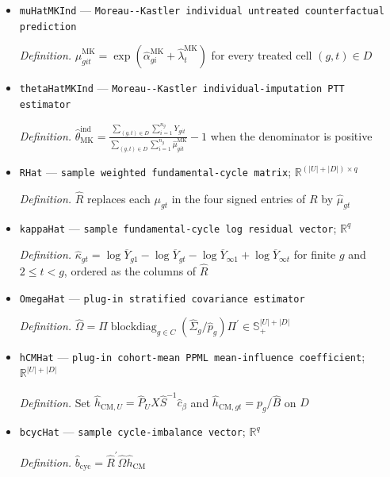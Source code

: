 \documentclass{article}
\begin{document}
\begin{itemize}
  \item \texttt{muHatMKInd} --- \texttt{Moreau-\allowbreak{}-\allowbreak{}Kastler individual untreated counterfactual prediction}
  \par\smallskip\noindent\emph{Definition.} \(\widehat\mu^{\mathrm{MK}}_{git}=\exp(\widehat\alpha^{\mathrm{MK}}_{gi}+\widehat\lambda^{\mathrm{MK}}_t)\) for every treated cell \((g,t)\in D\)
  \item \texttt{thetaHatMKInd} --- \texttt{Moreau-\allowbreak{}-\allowbreak{}Kastler individual-\allowbreak{}imputation PTT estimator}
  \par\smallskip\noindent\emph{Definition.} \(\widehat\theta_{\mathrm{MK}}^{\mathrm{ind}}=\frac{\sum_{(g,t)\in D}\sum_{i=1}^{n_g}Y_{git}}{\sum_{(g,t)\in D}\sum_{i=1}^{n_g}\widehat\mu^{\mathrm{MK}}_{git}}-1\) when the denominator is positive
  \item \texttt{RHat} --- \texttt{sample weighted fundamental-\allowbreak{}cycle matrix}; \(\mathbb R^{(|U|+|D|)\times q}\)
  \par\smallskip\noindent\emph{Definition.} \(\widehat R\) replaces each \(\mu_{gt}\) in the four signed entries of \(R\) by \(\widehat\mu_{gt}\)
  \item \texttt{kappaHat} --- \texttt{sample fundamental-\allowbreak{}cycle log residual vector}; \(\mathbb R^q\)
  \par\smallskip\noindent\emph{Definition.} \(\widehat\kappa_{gt}=\log\overline Y_{g1}-\log\overline Y_{gt}-\log\overline Y_{\infty 1}+\log\overline Y_{\infty t}\) for finite \(g\) and \(2\le t<g\), ordered as the columns of \(\widehat R\)
  \item \texttt{OmegaHat} --- \texttt{plug-\allowbreak{}in stratified covariance estimator}
  \par\smallskip\noindent\emph{Definition.} \(\widehat\Omega=\Pi\operatorname{blockdiag}_{g\in C}(\widehat\Sigma_g/\widehat p_g)\Pi^{\prime}\in\mathbb S_+^{|U|+|D|}\)
  \item \texttt{hCMHat} --- \texttt{plug-\allowbreak{}in cohort-\allowbreak{}mean PPML mean-\allowbreak{}influence coefficient}; \(\mathbb R^{|U|+|D|}\)
  \par\smallskip\noindent\emph{Definition.} Set \(\widehat h_{\mathrm{CM},U}=\widehat P_UX\widehat S^{-1}\widehat c_{\beta}\) and \(\widehat h_{\mathrm{CM},gt}=p_g/\widehat B\) on \(D\)
  \item \texttt{bcycHat} --- \texttt{sample cycle-\allowbreak{}imbalance vector}; \(\mathbb R^q\)
  \par\smallskip\noindent\emph{Definition.} \(\widehat b_{\mathrm{cyc}}=\widehat R^{\prime}\widehat\Omega\widehat h_{\mathrm{CM}}\)

\end{itemize}
\end{document}
